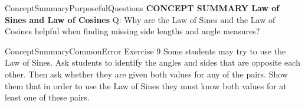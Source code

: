 \documentclass{article}
\newenvironment{te-addendum}[2]{}{}     %
\newcommand{\answer}[1]{}               %
\newcommand{\te}[1]{}                   %
\begin{document}
\begin{te-addendum}{ConceptSummary}{PurposefulQuestions}
\textbf{CONCEPT SUMMARY Law of Sines and Law of Cosines}
Q: Why are the Law of Sines and the Law of Cosines helpful when finding missing side lengths and angle measures?
\answer{These laws allow you to find missing side lengths and angle measurements in acute and obtuse triangles.}
\te{Presentation. Practice. Concept Summary, Do You Understand, and Do You Know How are available at SavvasRealize.com.}
\end{te-addendum}
\begin{te-addendum}{ConceptSummary}{CommonError}
Exercise 9 Some students may try to use the Law of Sines. Ask students to identify the angles and sides that are opposite each other. Then ask whether they are given both values for any of the pairs. Show them that in order to use the Law of Sines they must know both values for at least one of these pairs.
\end{te-addendum}
\end{document}
